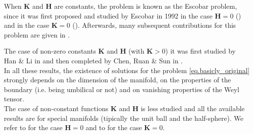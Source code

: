 \documentclass[11pt,a4paper]{amsart}
\begin{document}
When $\mathbf{K}$ and $\mathbf{H}$ are constants, the problem is known as the Escobar problem, since it was first proposed and studied by Escobar in 1992 in the case $\mathbf{H}=0$ (\cite{Escobar_1992,Escobar_1996}) and in the case $\mathbf{K}=0$ (\cite{Escobar_1992a}). 
Afterwards, many subsequent contributions for this problem are given in \cite{Almaraz, BrendleChen, MayerNdiaye_2017,Marques_2005}.

The case of non-zero constants $\mathbf{K}$ and $\mathbf{H}$ (with $\mathbf{K}>0$) it was first studied by Han \& Li in \cite{HanLi_1999,HanLi_2000} and then completed by Chen, Ruan \& Sun in \cite{ChenRuanSun}.\\ In all these results, the existence of solutions for the problem \eqref{eq.basicly_original} strongly depends on the dimension of the manifold, on the properties of the boundary (i.e. being umbilical or not) and on vanishing properties of the Weyl tensor.\\

The case of non-constant functions $\mathbf{K}$ and $\mathbf{H}$ is less studied and all the available results are for special manifolds (tipically the unit ball and the half-sphere). We refer to \cite{Li_1995,Li_1996,AhmedouBenAyed_2021,BenAyedElMehdiOuldAhmedou_2005,BenAyedElMehdiAhmedou_2002} for the case $\mathbf{H}=0$ and to \cite{AbdelhediChtiouiAhmedou_2008,DjadliMalchiodiAhmedou_2004,XuZhang_2016,ChangXuYang_1998} for  the case $\mathbf{K}=0$.\\
\end{document}
